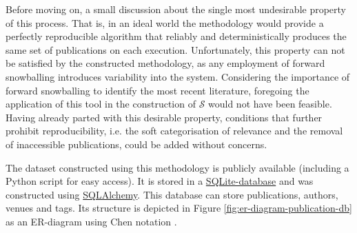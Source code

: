 \documentclass[11pt,a4paper]{book}
\theoremstyle{definition}
\theoremstyle{definition}
\theoremstyle{definition}
\theoremstyle{remark}
\newcommand{\tpsetb}{\mathcal{S}_{\mathit{-1}}}
\newcommand{\tpsetbb}{\mathcal{S}_{\mathit{-2}}}
\newcommand{\tpsetf}{\mathcal{S}_{\mathit{+1}}}
\newcommand{\tpsetff}{\mathcal{S}_{\mathit{+2}}}
\newcommand{\tpsetfb}{\mathcal{S}_{\mathit{+1-1}}}
\newcommand{\tpsetffb}{\mathcal{S}_{\mathit{+2-1}}}
\newcommand{\pset}{S}
\newcommand{\psetz}{S_{\mathit{0}}}
\newcommand{\psetb}{S_{\mathit{-1}}}
\newcommand{\psetbb}{S_{\mathit{-2}}}
\newcommand{\psetf}{S_{\mathit{+1}}}
\newcommand{\psetff}{S_{\mathit{+2}}}
\newcommand{\psetfb}{S_{\mathit{+1-1}}}
\newcommand{\psetffb}{S_{\mathit{+2-1}}}
\newcommand{\xset}{\mathcal{S}}
\begin{document}
%


Before moving on, a small discussion about the single most undesirable property of this process. That is, in an ideal world the methodology would provide a perfectly reproducible algorithm that reliably and deterministically produces the same set of publications on each execution.
Unfortunately, this property can not be satisfied by the constructed methodology, as any employment of forward snowballing introduces variability into the system. Considering the importance of forward snowballing to identify the most recent literature, foregoing the application of this tool in the construction of $\xset$ would not have been feasible. Having already parted with this desirable property, conditions that further prohibit reproducibility, i.e. the soft categorisation of relevance and the removal of inaccessible publications, could be added without concerns.



The dataset constructed using this methodology is publicly available (including a Python script for easy access). It is stored in a \href{https://www.sqlite.org/index.html}{SQLite-database} and was constructed using \href{https://www.sqlalchemy.org}{SQLAlchemy}.
This database can store publications, authors, venues and tags. Its structure is depicted in Figure \ref{fig:er-diagram-publication-db} as an ER-diagram using Chen notation \parencite{chen1976entity}.
\end{document}
